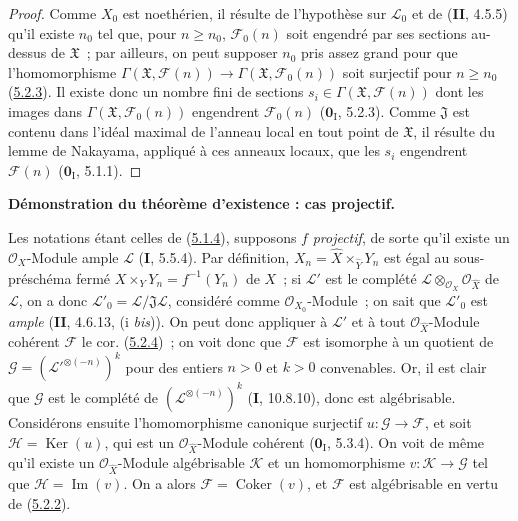 \begin{proof}
Comme $X_0$ est noethérien, il résulte de l'hypothèse sur $\mathcal L_0$ et de
(\textbf{II}, 4.5.5) qu'il existe $n_0$ tel que, pour $n\geq n_0$, $\mathcal F_0(n)$ soit
engendré par ses sections au-dessus de $\mathfrak X$~; par ailleurs, on peut supposer
$n_0$ pris assez grand pour que l'homomorphisme
$\Gamma(\mathfrak X,\mathcal F(n))\longrightarrow
\Gamma(\mathfrak X,\mathcal F_0(n))$
soit surjectif pour $n\geq n_0$ (\hyperref[III.5.2.3-fr]{5.2.3}). Il existe donc
un nombre fini de sections $s_i\in\Gamma(\mathfrak X,\mathcal F(n))$ dont les
images dans $\Gamma(\mathfrak X,\mathcal F_0(n))$ engendrent $\mathcal F_0(n)$
($\mathbf{0}_{\mathrm I}$, 5.2.3). Comme $\mathfrak J$ est contenu dans l'idéal maximal de
l'anneau local en tout point de $\mathfrak X$, il résulte du lemme de Nakayama,
appliqué à ces anneaux locaux, que les $s_i$ engendrent $\mathcal F(n)$
($\mathbf{0}_{\mathrm I}$, 5.1.1).
\end{proof}

\begin{env}[5.2.5]
\label{III.5.2.5-fr}
\textbf{Démonstration du théorème d'existence : cas projectif.}

Les notations étant celles de (\hyperref[III.5.1.4-fr]{5.1.4}), supposons $f$
\emph{projectif}, de sorte qu'il existe un $\mathcal O_X$-Module ample $\mathcal L$
(\textbf{I}, 5.5.4). Par définition, $X_n=\widehat X\times_{\widehat Y}Y_n$ est égal au
sous-préschéma fermé $X\times_Y Y_n=f^{-1}(Y_n)$ de $X$~; si
$\mathcal L'$ est le
complété $\mathcal L\otimes_{\mathcal O_X}\mathcal O_{\widehat X}$ de $\mathcal L$, on a donc
$\mathcal L'_0=\mathcal L/\mathfrak J\mathcal L$, considéré comme
$\mathcal O_{X_0}$-Module~; on sait que $\mathcal L'_0$ est \emph{ample}
(\textbf{II}, 4.6.13, (i \emph{bis})). On peut donc appliquer à $\mathcal L'$ et à tout
$\mathcal O_{\widehat X}$-Module cohérent $\mathcal F$ le cor.
(\hyperref[III.5.2.4-fr]{5.2.4})~; on voit donc que $\mathcal F$ est isomorphe à
un quotient de
$\mathcal G=(\mathcal L'^{\otimes(-n)})^k$
pour des entiers $n>0$ et $k>0$ convenables. Or, il est clair que $\mathcal G$ est
le complété de $(\mathcal L^{\otimes(-n)})^k$ (\textbf{I}, 10.8.10), donc est
algébrisable. Considérons ensuite l'homomorphisme canonique surjectif
$u:\mathcal G\to\mathcal F$, et soit $\mathcal H=\operatorname{Ker}(u)$, qui est
un $\mathcal O_{\widehat X}$-Module cohérent ($\mathbf{0}_{\mathrm I}$, 5.3.4). On voit de
même qu'il existe un $\mathcal O_{\widehat X}$-Module algébrisable $\mathcal K$ et
un homomorphisme $v:\mathcal K\to\mathcal G$ tel que
$\mathcal H=\operatorname{Im}(v)$. On a alors
$\mathcal F=\operatorname{Coker}(v)$, et $\mathcal F$ est algébrisable en vertu de
(\hyperref[III.5.2.2-fr]{5.2.2}).
\end{env}

